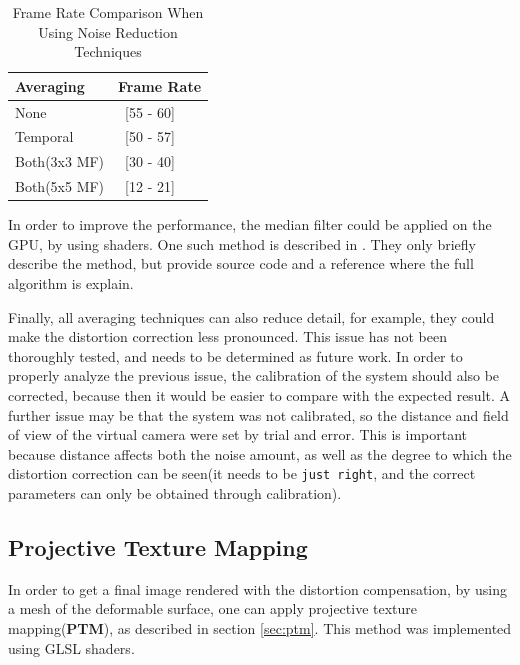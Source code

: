 \documentclass[]{article}
\begin{document}
\begin{table}
\begin{center}
    \begin{tabular}{ | l | l |}
    \hline
    Averaging & Frame Rate \\ \hline
    None & ~[55 - 60] \\ \hline
    Temporal & ~[50 - 57] \\ \hline
    Both(3x3 MF) & ~[30 - 40] \\ \hline
    Both(5x5 MF) & ~[12 - 21] \\
    \hline
    \end{tabular}    
    
\end{center}
\caption{Frame Rate Comparison When Using Noise Reduction Techniques}
\label{tabel:FrameRateReductionDueToAveraging}
\end{table}

In order to improve the performance, the median filter could be applied on the GPU, by using shaders. One such method  is described in \cite{park}. They only briefly describe the method, but provide source code and a reference where the full algorithm is explain.

Finally, all averaging techniques can also reduce detail, for example, they could make the distortion correction less pronounced. This issue has not been thoroughly tested, and needs to be determined as future work. In order to properly analyze the previous issue, the calibration of the system should also be corrected, because then it would be easier to compare with the expected result. A further issue may be that the system was not calibrated, so the distance and field of view of the virtual camera were set by trial and error. This is important because distance affects both the noise amount, as well as the degree to which the distortion correction can be seen(it needs to be \verb|just right|, and the correct parameters can only be obtained through calibration).

\subsection{Projective Texture Mapping}

In order to get a final image rendered with the distortion compensation, by using a mesh of the deformable surface, one can apply projective texture mapping(\textbf{PTM}), as described in section \ref{sec:ptm}. This method was implemented using GLSL shaders. 
\end{document}
